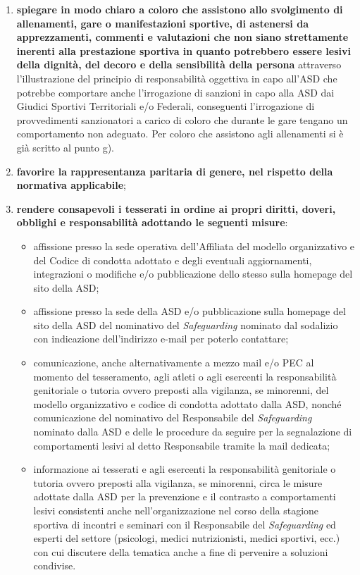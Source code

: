 \documentclass{djtsdoc}
\begin{document}
\begin{enumerate}
\begin{enumerate}
			\item \textbf{spiegare in modo chiaro a coloro che assistono allo svolgimento di allenamenti, gare o manifestazioni sportive, di astenersi da apprezzamenti, commenti e valutazioni che non siano strettamente inerenti alla prestazione sportiva in quanto potrebbero essere lesivi della dignità, del decoro e della sensibilità della persona} attraverso l'illustrazione del principio di responsabilità oggettiva in capo all'ASD che potrebbe comportare anche l'irrogazione di sanzioni in capo alla ASD dai Giudici Sportivi Territoriali e/o Federali, conseguenti l'irrogazione di provvedimenti sanzionatori a carico di coloro che durante le gare tengano un comportamento non adeguato. Per coloro che assistono agli allenamenti si è già scritto al punto g).
			\item \textbf{favorire la rappresentanza paritaria di genere, nel rispetto della normativa applicabile};
			\item \textbf{rendere consapevoli i tesserati in ordine ai propri diritti, doveri, obblighi e responsabilità adottando le seguenti misure}:
			\begin{itemize}
				\item affissione presso la sede operativa dell'Affiliata del modello organizzativo e del Codice di condotta adottato e degli eventuali aggiornamenti, integrazioni o modifiche e/o pubblicazione dello  stesso sulla homepage del sito della ASD;
				\item affissione presso la sede della ASD e/o pubblicazione sulla homepage del sito della ASD del nominativo del \textit{Safeguarding} nominato dal sodalizio con indicazione dell'indirizzo e-mail per poterlo contattare;
				\item comunicazione, anche alternativamente a mezzo mail e/o PEC al momento del tesseramento, agli atleti o agli esercenti la responsabilità genitoriale o tutoria ovvero preposti alla vigilanza, se minorenni, del modello organizzativo e codice di condotta adottato dalla ASD, nonché comunicazione del nominativo del Responsabile del \textit{Safeguarding} nominato dalla ASD e delle le procedure da seguire per la segnalazione di comportamenti lesivi al detto Responsabile tramite la mail dedicata; 
				\item informazione ai tesserati e agli esercenti la responsabilità genitoriale o tutoria ovvero preposti alla vigilanza, se minorenni, circa le misure adottate dalla ASD per la prevenzione e il contrasto a comportamenti lesivi consistenti anche nell'organizzazione nel corso della stagione sportiva di incontri e seminari  con il Responsabile del \textit{Safeguarding} ed esperti del settore (psicologi, medici nutrizionisti, medici sportivi, ecc.) con cui discutere della tematica anche a fine di pervenire a soluzioni condivise.

\end{itemize}
\end{enumerate}
\end{enumerate}
\end{document}
